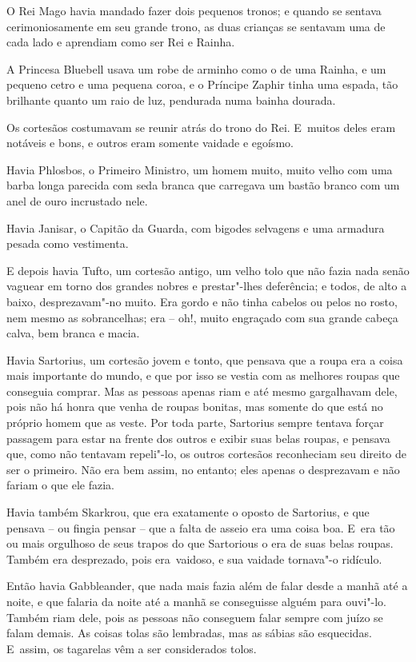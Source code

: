 O Rei Mago havia mandado fazer dois pequenos tronos; e quando se
sentava cerimoniosamente em seu grande trono, as duas crianças se
sentavam uma de cada lado e aprendiam como ser Rei e Rainha.

A Princesa Bluebell usava um robe de arminho como o de uma Rainha, e um
pequeno cetro e uma pequena coroa, e o Príncipe Zaphir tinha uma espada,
tão brilhante quanto um raio de luz, pendurada numa bainha dourada.

Os cortesãos costumavam se reunir atrás do trono do Rei. E~muitos deles
eram notáveis e bons, e outros eram somente vaidade e egoísmo.

Havia Phlosbos, o Primeiro Ministro, um homem muito, muito velho com uma
barba longa parecida com seda branca que carregava um bastão branco com
um anel de ouro incrustado nele.

Havia Janisar, o Capitão da Guarda, com bigodes selvagens e uma armadura
pesada como vestimenta.

E depois havia Tufto, um cortesão antigo, um velho tolo que não fazia
nada senão vaguear em torno dos grandes nobres e prestar"-lhes
deferência; e todos, de alto a baixo, desprezavam"-no muito. Era
gordo e não tinha cabelos ou pelos no rosto, nem mesmo as sobrancelhas;
era -- oh!, muito engraçado com sua grande cabeça calva, bem branca e
macia.

Havia Sartorius, um cortesão jovem e tonto, que pensava que a roupa era a
coisa mais importante do mundo, e que por isso se vestia com as melhores
roupas que conseguia comprar. Mas as pessoas apenas riam e até mesmo
gargalhavam dele, pois não há honra que venha de roupas bonitas, mas somente do
que está no próprio homem que as veste. Por toda parte, Sartorius sempre
tentava forçar passagem para estar na frente dos outros e exibir suas
belas roupas, e pensava que, como não tentavam repeli"-lo,
os outros cortesãos reconheciam seu direito de ser o primeiro.
Não era bem assim, no entanto; eles apenas o desprezavam e não fariam o que
ele fazia.

Havia também Skarkrou, que era exatamente o oposto de Sartorius, e que
pensava -- ou fingia pensar -- que a falta de asseio era uma coisa boa.
E~era tão ou mais orgulhoso de seus trapos do que Sartorious o era
de suas belas roupas. Também era desprezado, pois era~vaidoso, e sua
vaidade tornava"-o ridículo.

Então havia Gabbleander, que nada mais fazia além de falar desde a manhã
até a noite, e que falaria da noite até a manhã se conseguisse alguém
para ouvi"-lo. Também riam dele, pois as pessoas não conseguem falar
sempre com juízo se falam demais. As coisas tolas são lembradas, mas as
sábias são esquecidas. E~assim, os tagarelas vêm a ser considerados
tolos.

